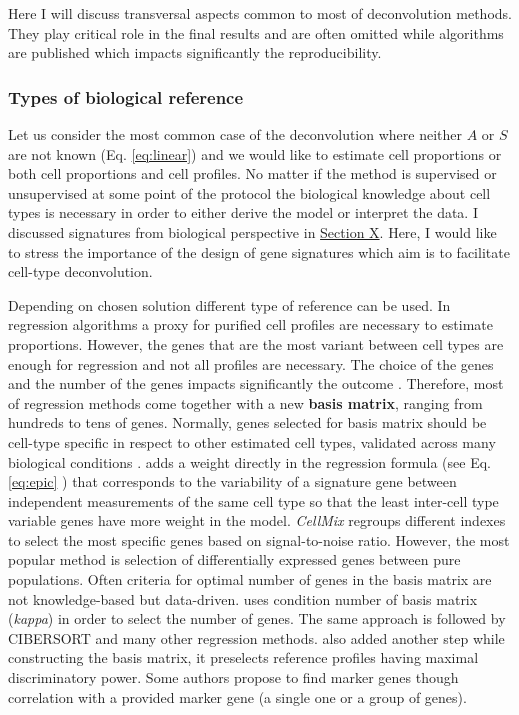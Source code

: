 \documentclass[12pt,]{book}
\theoremstyle{definition}
\theoremstyle{definition}
\theoremstyle{definition}
\theoremstyle{remark}
\begin{document}
Here I will discuss transversal aspects common to most of deconvolution
methods. They play critical role in the final results and are often
omitted while algorithms are published which impacts significantly the
reproducibility.

\hypertarget{types-of-biological-reference}{%
\subsubsection{Types of biological
reference}\label{types-of-biological-reference}}

Let us consider the most common case of the deconvolution where neither
\(A\) or \(S\) are not known (Eq. \eqref{eq:linear}) and we would like to
estimate cell proportions or both cell proportions and cell profiles. No
matter if the method is supervised or unsupervised at some point of the
protocol the biological knowledge about cell types is necessary in order
to either derive the model or interpret the data. I discussed signatures
from biological perspective in
\protect\hyperlink{immune-signatures}{Section X}. Here, I would like to
stress the importance of the design of gene signatures which aim is to
facilitate cell-type deconvolution.

Depending on chosen solution different type of reference can be used. In
regression algorithms a proxy for purified cell profiles are necessary
to estimate proportions. However, the genes that are the most variant
between cell types are enough for regression and not all profiles are
necessary. The choice of the genes and the number of the genes impacts
significantly the outcome \citep{Vallania2017}. Therefore, most of
regression methods come together with a new \textbf{basis matrix},
ranging from hundreds to tens of genes. Normally, genes selected for
basis matrix should be cell-type specific in respect to other estimated
cell types, validated across many biological conditions
\citep{Hoffmann2006}. \citet{Racle2017} adds a weight directly in the
regression formula (see Eq. \eqref{eq:epic} ) that corresponds to the
variability of a signature gene between independent measurements of the
same cell type so that the least inter-cell type variable genes have
more weight in the model. \emph{CellMix} \citep{Gaujoux2013} regroups
different indexes to select the most specific genes based on
signal-to-noise ratio. However, the most popular method is selection of
differentially expressed genes between pure populations. Often criteria
for optimal number of genes in the basis matrix are not knowledge-based
but data-driven. \citet{Abbas2009} uses condition number of basis matrix
(\emph{kappa}) in order to select the number of genes. The same approach
is followed by CIBERSORT and many other regression methods.
\citet{Newman2015} also added another step while constructing the basis
matrix, it preselects reference profiles having maximal discriminatory
power. Some authors \citep{Ju2013, Nelms2016} propose to find marker
genes though correlation with a provided marker gene (a single one or a
group of genes).
\end{document}
